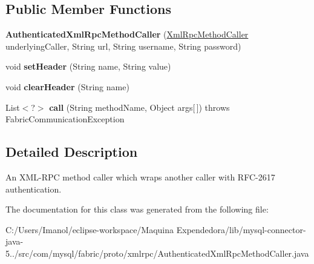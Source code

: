\subsection*{Public Member Functions}
\begin{DoxyCompactItemize}
\item 
\mbox{\label{classcom_1_1mysql_1_1fabric_1_1proto_1_1xmlrpc_1_1_authenticated_xml_rpc_method_caller_ab1e4235d715b76e64519f2b3579f032e}} 
{\bfseries Authenticated\+Xml\+Rpc\+Method\+Caller} (\mbox{\hyperlink{interfacecom_1_1mysql_1_1fabric_1_1proto_1_1xmlrpc_1_1_xml_rpc_method_caller}{Xml\+Rpc\+Method\+Caller}} underlying\+Caller, String url, String username, String password)
\item 
\mbox{\label{classcom_1_1mysql_1_1fabric_1_1proto_1_1xmlrpc_1_1_authenticated_xml_rpc_method_caller_a0b3cfce97293b2c9112cc7f7ea2744be}} 
void {\bfseries set\+Header} (String name, String value)
\item 
\mbox{\label{classcom_1_1mysql_1_1fabric_1_1proto_1_1xmlrpc_1_1_authenticated_xml_rpc_method_caller_af794020b7094fe4b8c2c74d5e7472a45}} 
void {\bfseries clear\+Header} (String name)
\item 
\mbox{\label{classcom_1_1mysql_1_1fabric_1_1proto_1_1xmlrpc_1_1_authenticated_xml_rpc_method_caller_aac7ca25d4b8b02acd7529fbee79feabe}} 
List$<$?$>$ {\bfseries call} (String method\+Name, Object args\mbox{[}$\,$\mbox{]})  throws Fabric\+Communication\+Exception 
\end{DoxyCompactItemize}


\subsection{Detailed Description}
An X\+M\+L-\/\+R\+PC method caller which wraps another caller with R\+F\+C-\/2617 authentication. 

The documentation for this class was generated from the following file\+:\begin{DoxyCompactItemize}
\item 
C\+:/\+Users/\+Imanol/eclipse-\/workspace/\+Maquina Expendedora/lib/mysql-\/connector-\/java-\/5../src/com/mysql/fabric/proto/xmlrpc/Authenticated\+Xml\+Rpc\+Method\+Caller.\+java\end{DoxyCompactItemize}
